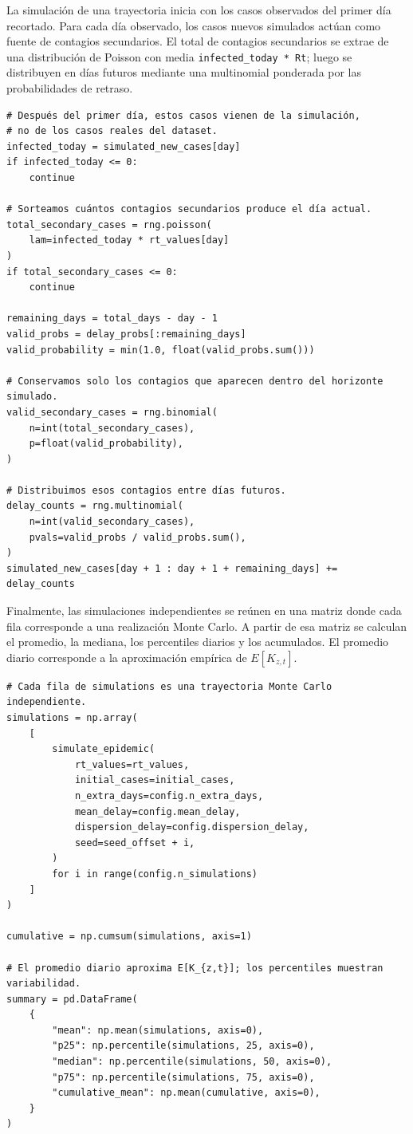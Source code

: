 \documentclass[12pt]{article}
\begin{document}
La simulación de una trayectoria inicia con los casos observados del primer día
recortado. Para cada día observado, los casos nuevos simulados actúan como
fuente de contagios secundarios. El total de contagios secundarios se extrae de
una distribución de Poisson con media \texttt{infected\_today * Rt}; luego se
distribuyen en días futuros mediante una multinomial ponderada por las
probabilidades de retraso.

\begin{lstlisting}[caption={Generación y asignación de contagios secundarios.},label={lst:secondary-cases}]
# Después del primer día, estos casos vienen de la simulación,
# no de los casos reales del dataset.
infected_today = simulated_new_cases[day]
if infected_today <= 0:
    continue

# Sorteamos cuántos contagios secundarios produce el día actual.
total_secondary_cases = rng.poisson(
    lam=infected_today * rt_values[day]
)
if total_secondary_cases <= 0:
    continue

remaining_days = total_days - day - 1
valid_probs = delay_probs[:remaining_days]
valid_probability = min(1.0, float(valid_probs.sum()))

# Conservamos solo los contagios que aparecen dentro del horizonte simulado.
valid_secondary_cases = rng.binomial(
    n=int(total_secondary_cases),
    p=float(valid_probability),
)

# Distribuimos esos contagios entre días futuros.
delay_counts = rng.multinomial(
    n=int(valid_secondary_cases),
    pvals=valid_probs / valid_probs.sum(),
)
simulated_new_cases[day + 1 : day + 1 + remaining_days] += delay_counts
\end{lstlisting}

Finalmente, las simulaciones independientes se reúnen en una matriz donde cada
fila corresponde a una realización Monte Carlo. A partir de esa matriz se
calculan el promedio, la mediana, los percentiles diarios y los acumulados. El
promedio diario corresponde a la aproximación empírica de \(E[K_{z,t}]\).

\begin{lstlisting}[caption={Resumen de las realizaciones Monte Carlo.},label={lst:summary}]
# Cada fila de simulations es una trayectoria Monte Carlo independiente.
simulations = np.array(
    [
        simulate_epidemic(
            rt_values=rt_values,
            initial_cases=initial_cases,
            n_extra_days=config.n_extra_days,
            mean_delay=config.mean_delay,
            dispersion_delay=config.dispersion_delay,
            seed=seed_offset + i,
        )
        for i in range(config.n_simulations)
    ]
)

cumulative = np.cumsum(simulations, axis=1)

# El promedio diario aproxima E[K_{z,t}]; los percentiles muestran variabilidad.
summary = pd.DataFrame(
    {
        "mean": np.mean(simulations, axis=0),
        "p25": np.percentile(simulations, 25, axis=0),
        "median": np.percentile(simulations, 50, axis=0),
        "p75": np.percentile(simulations, 75, axis=0),
        "cumulative_mean": np.mean(cumulative, axis=0),
    }
)
\end{lstlisting}
\end{document}
